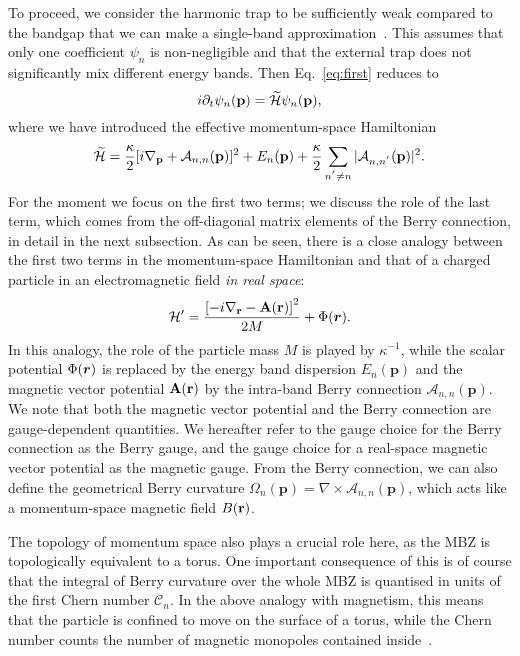 To proceed, we consider the harmonic trap to be sufficiently weak
compared to the bandgap that we can make a single-band
approximation~\cite{price2014magnetic}. This assumes that only one
coefficient $\psi_n$ is non-negligible and that the external trap does
not significantly mix different energy bands. Then Eq.~\eqref{eq:first}
reduces to
%
\begin{equation} i \partial_t \psi_n(\mathbf{p}) = \widetilde{\mathcal{H}}
\psi_n(\mathbf{p}) ,
\end{equation} where we have introduced the effective momentum-space
Hamiltonian
%
\begin{equation}\label{eq:dual} \widetilde{\mathcal{H}} =
\frac{\kappa}{2} [i\nabla_{\mathbf{p}} + \mathcal{A}_{n,
n}(\mathbf{p})]^2 + E_n(\mathbf{p}) + \frac{\kappa}{2}\sum_{n^{'}\neq
n} \vert \mathcal{A}_{n,n^{'}}(\mathbf{p}) \vert^2.
\end{equation}
%
For the moment we focus on the first two terms; we discuss the role of
the last term, which comes from the off-diagonal matrix elements of
the Berry connection, in detail in the next subsection.  As can be
seen, there is a close analogy between the first two terms in the
momentum-space Hamiltonian and that of a charged particle in an
electromagnetic field {\em in real space}:
%
\begin{equation}\label{eq:mag} \mathcal{H}'=
\frac{\left[-i\nabla_{\mathbf{r}} - \mathbf{A}(\mathbf{r})\right]^2}{2M} +
\Phi(\bm{r}).
\end{equation}
%
In this analogy, the role of the particle mass $M$ is played by
$\kappa^{-1}$, while the scalar potential $ \Phi(\bm{r})$ is replaced by
the energy band dispersion $E_n(\mathbf{p})$ and the magnetic vector
potential $\mathbf{A}(\mathbf{r})$ by the intra-band Berry connection
$\mathcal{A}_{n, n}(\mathbf{p})$. We note that both the magnetic
vector potential and the Berry connection are gauge-dependent
quantities. We hereafter refer to the gauge choice for the Berry
connection as the Berry gauge, and the gauge choice for a real-space
magnetic vector potential as the magnetic gauge. From the Berry
connection, we can also define the geometrical Berry curvature
$\Omega_{n}(\mathbf{p}) =\nabla \times \mathcal{A}_{n,
n}(\mathbf{p})$, which acts like a momentum-space magnetic field
$B(\mathbf{r})$.

The topology of momentum space also plays a crucial role here, as the
MBZ is topologically equivalent to a torus. One important consequence
of this is of course that the integral of Berry curvature over the
whole MBZ is quantised in units of the first Chern number
$\mathcal{C}_n$. In the above analogy with magnetism, this means that
the particle is confined to move on the surface of a torus, while the
Chern number counts the number of magnetic monopoles contained
inside~\cite{Fang}.

